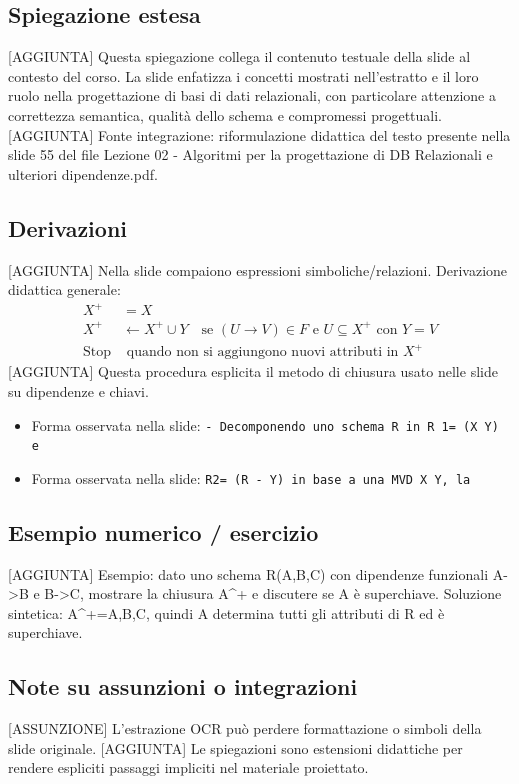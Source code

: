 \documentclass[11pt]{article}
\begin{document}
\subsection*{Spiegazione estesa}
[AGGIUNTA] Questa spiegazione collega il contenuto testuale della slide al contesto del corso. La slide enfatizza i concetti mostrati nell'estratto e il loro ruolo nella progettazione di basi di dati relazionali, con particolare attenzione a correttezza semantica, qualità dello schema e compromessi progettuali.
[AGGIUNTA] Fonte integrazione: riformulazione didattica del testo presente nella slide 55 del file Lezione 02 - Algoritmi per la progettazione di DB Relazionali e ulteriori dipendenze.pdf.
\subsection*{Derivazioni}
[AGGIUNTA] Nella slide compaiono espressioni simboliche/relazioni. Derivazione didattica generale:
\begin{align*}
X^+ &= X \\
X^+ &\leftarrow X^+ \cup Y \quad \text{se } (U \to V) \in F \text{ e } U \subseteq X^+ \text{ con } Y=V \\
\text{Stop} &\text{ quando non si aggiungono nuovi attributi in } X^+
\end{align*}
[AGGIUNTA] Questa procedura esplicita il metodo di chiusura usato nelle slide su dipendenze e chiavi.
\begin{itemize}[leftmargin=*]
\item Forma osservata nella slide: \texttt{-  Decomponendo uno schema R in R 1= (X   Y) e}
\item Forma osservata nella slide: \texttt{R2= (R - Y) in base a una MVD X   Y, la}
\end{itemize}
\subsection*{Esempio numerico / esercizio}
[AGGIUNTA] Esempio: dato uno schema R(A,B,C) con dipendenze funzionali A->B e B->C, mostrare la chiusura A^+ e discutere se A è superchiave. Soluzione sintetica: A^+={A,B,C}, quindi A determina tutti gli attributi di R ed è superchiave.
\subsection*{Note su assunzioni o integrazioni}
[ASSUNZIONE] L'estrazione OCR può perdere formattazione o simboli della slide originale.
[AGGIUNTA] Le spiegazioni sono estensioni didattiche per rendere espliciti passaggi impliciti nel materiale proiettato.
\end{document}
